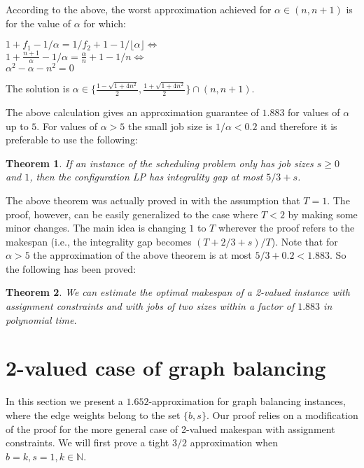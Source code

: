 \documentclass[11pt]{article}\usepackage{amsmath}
\newtheorem{theorem}{Theorem}[section]
\begin{document}
According to the above, the worst approximation achieved for $\alpha \in (n,n+1)$ is for the value of $\alpha$ for which:

\begin{center}
$1+f_1-1/\alpha=1/f_2+1-1/\lfloor \alpha  \rfloor \Leftrightarrow $\\
$1+\frac{n+1}{\alpha}-1/\alpha=\frac{\alpha}{n}+1-1/n \Leftrightarrow $\\
$\alpha^2-\alpha-n^2=0$\\
\end{center}


The solution is  $\alpha \in 
\{ \frac{1-\sqrt{1+4n^2}}{2}, \frac{1+\sqrt{1+4n^2}}{2}\} \cap (n,n+1)$.


 The above calculation  gives an approximation guarantee of $1.883$ for values of $\alpha $ up to $5$. For values of $\alpha > 5$ the small job size is $1/\alpha  < 0.2$ and therefore it is preferable to use the following:

\begin{theorem}
\cite{svensson} If an instance of the scheduling problem only has job sizes $s \geq 0$ and $1$, then the configuration LP has integrality gap at most $5/3+s$.
\end{theorem}

The above theorem was actually proved in \cite{svensson} with the assumption that $T=1$. The proof, however, can be easily generalized to the case where $T<2$ by making some minor changes. The main idea is changing $1$ to $T$ wherever the proof refers to the makespan (i.e., the integrality gap becomes $(T+2/3+s)/T$).
Note that for $\alpha  > 5$ the approximation of the above theorem is at most $5/3+0.2<1.883$. So the following has been proved:


\begin{theorem}
We can estimate the optimal makespan of a 2-valued  instance with  assignment constraints and with jobs of two sizes within a factor of $1.883$ in polynomial time.
\end{theorem}



\section{2-valued case of graph balancing}

In this section we present a $1.652$-approximation for graph balancing instances, where the edge weights belong to the set $\{ b,s \}$. Our proof relies on a modification of the proof for the more general case of 2-valued makespan with assignment constraints. We will first prove a tight $3/2$ approximation when $b=k, s=1, k \in \mathbb{N}$.
\end{document}
